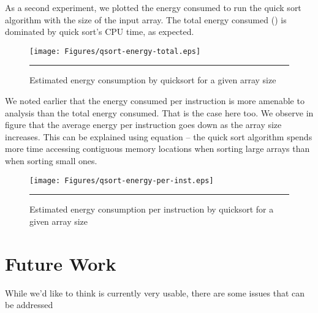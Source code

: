 As a second experiment, we plotted the energy consumed to run the
quick sort algorithm with the size of the input array.  The total
energy consumed () is
dominated by quick sort's CPU time, as expected.

\begin{figure}[htbp]
  \centering
  \texttt{[image: Figures/qsort-energy-total.eps]}
  \rule{35em}{0.5pt}
  \caption{Estimated energy consumption by quicksort for a given array size}
  \label{fig:qsort-energy-per-array-length}
\end{figure}

We noted earlier that the energy consumed per instruction is more
amenable to analysis than the total energy consumed.  That is the case
here too.  We observe in figure
 that the average
energy per instruction goes down as the array size increases.  This
can be explained using equation  -- the quick sort
algorithm spends more time accessing contiguous memory locations when
sorting large arrays than when sorting small ones.

\begin{figure}[htbp]
  \centering
  \texttt{[image: Figures/qsort-energy-per-inst.eps]}
  \rule{35em}{0.5pt}
  \caption{Estimated energy consumption per instruction by quicksort
    for a given array size}
  \label{fig:qsort-energy-per-inst-per-array-length}
\end{figure}

\section{Future Work}

While we'd like to think \wattage is currently very usable, there are
some issues that can be addressed

